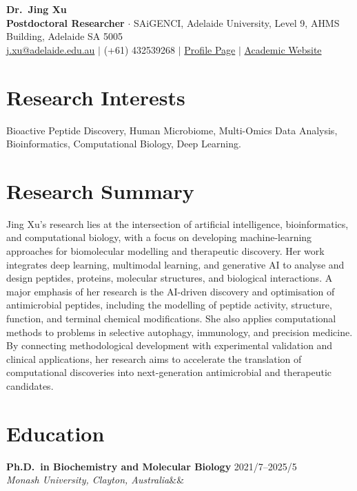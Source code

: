 \documentclass[10pt,a4paper]{article}
\newcommand{\cventry}[4]{%
  \par\addvspace{2pt}%
  \textbf{#1} \hfill #2 \\
  \textit{#3}\ifx&#4&\else \hfill \textit{#4}\fi \par\vspace{2pt}%
}
\begin{document}
\begin{center}
  {\Large\bfseries Dr.~Jing Xu} \\[2pt]
  {\small\textbf{Postdoctoral Researcher} $\cdot$ SAiGENCI, Adelaide University, Level 9, AHMS Building, Adelaide SA 5005} \\[2pt]
  {\small
  \href{mailto:j.xu@adelaide.edu.au}{j.xu@adelaide.edu.au} \quad$\vert$\quad
  (+61) 432539268 \quad$\vert$\quad
  \href{https://researchers.adelaide.edu.au/profile/j.xu}{Profile Page} \quad$\vert$\quad
  \href{https://joy50706.github.io/}{Academic Website}
  }
\end{center}
\vspace{-4pt}

\section{Research Interests}
Bioactive Peptide Discovery, Human Microbiome, Multi-Omics Data Analysis, Bioinformatics, Computational Biology, Deep Learning.

\section{Research Summary}
Jing Xu's research lies at the intersection of artificial intelligence, bioinformatics, and computational biology, with a focus on developing machine-learning approaches for biomolecular modelling and therapeutic discovery. Her work integrates deep learning, multimodal learning, and generative AI to analyse and design peptides, proteins, molecular structures, and biological interactions. A major emphasis of her research is the AI-driven discovery and optimisation of antimicrobial peptides, including the modelling of peptide activity, structure, function, and terminal chemical modifications. She also applies computational methods to problems in selective autophagy, immunology, and precision medicine. By connecting methodological development with experimental validation and clinical applications, her research aims to accelerate the translation of computational discoveries into next-generation antimicrobial and therapeutic candidates.

\section{Education}
\cventry{Ph.D.\ in Biochemistry and Molecular Biology}{2021/7--2025/5}{Monash University, Clayton, Australia}{}
\par
\end{document}
